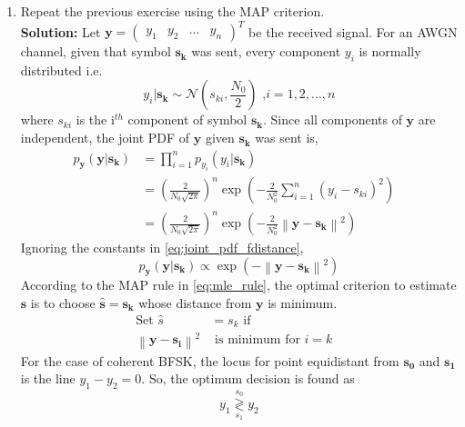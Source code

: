 \documentclass[journal,10pt,twocolumn]{IEEEtran}
\providecommand{\mbf}{\mathbf}
\providecommand{\norm}[1]{\left\lVert#1\right\rVert}
\newcommand{\solution}{\noindent \textbf{Solution: }}
\providecommand{\dec}[2]{\ensuremath{\overset{#1}{\underset{#2}{\gtrless}}}}
\newcommand{\myvec}[1]{\ensuremath{\begin{pmatrix}#1\end{pmatrix}}}
\providecommand{\gauss}[2]{\mathcal{N}\ensuremath{\left(#1,#2\right)}}
\let\vec\mathbf
\begin{document}
\begin{enumerate}
\solution The decision rule is
\begin{equation}
y_1 \dec{s_0}{s_1} y_2
\end{equation}
\item
Repeat the previous exercise using the MAP criterion.\\
\solution Let $\mbf{y} = \myvec{y_1&y_2&...&y_n}^T$ be the received signal. For an AWGN channel, given that symbol $\mbf{s_k}$ was sent, %
every component $y_i$ is normally distributed i.e. 
\begin{equation}
y_i|\mbf{s_k} \sim \gauss{s_{ki}}{\frac{N_0}{2}}\text{   ,} i=1,2,...,n 
\end{equation}
where $s_{ki}$ is the i$^{th}$ component of symbol $\mbf{s_k}$. Since all components of $\mbf{y}$ are independent, the joint PDF of $\mbf{y}$ given %
$\mbf{s_k}$ was sent is,
\begin{align}
	p_{\mbf{y}}(\mbf{y}|\mbf{s_k}) &= \prod\limits_{i=1}^{n} p_{y_i}(y_i|\mbf{s_k})&\\
	&= \left(\frac{2}{N_0\sqrt{2\pi}}\right)^n \exp\left(-\frac{2}{N_0^2}\sum\limits_{i=1}^{n} (y_i-s_{ki})^2\right)\\
	\label{eq:joint_pdf_fdistance}
	&= \left(\frac{2}{N_0\sqrt{2\pi}}\right)^n \exp\left(-\frac{2}{N_0^2}\norm{\vec{y}-\vec{s_k}}^2\right)
\end{align}
Ignoring the constants in \eqref{eq:joint_pdf_fdistance},
\begin{equation}
	p_{\mbf{y}}(\mbf{y}|\mbf{s_k}) \propto \exp\left(-\norm{\vec{y}-\vec{s_k}}^2\right)
\end{equation}
According to the MAP rule in \eqref{eq:mle_rule}, the optimal criterion to estimate $\vec{s}$ is to choose $\vec{\hat{s}}=\vec{s_k}$ whose
distance from $\vec{y}$ is minimum.
\begin{align}
	\label{eq:AWGN_est_rule}
	\text{Set } \hat{s} &= s_k \text{ if}&\\ \nonumber
	\norm{\vec{y}-\vec{s_i}}^2 & \text{ is minimum for } i = k
\end{align}
For the case of coherent BFSK, the locus for point equidistant from $\vec{s_0}$ and $\vec{s_1}$ is the line $y_1-y_2=0$. So, the optimum
decision is found as 
\begin{equation}
y_1 \dec{s_0}{s_1} y_2
\end{equation}


\end{enumerate}
\end{document}
